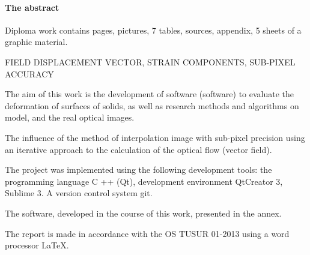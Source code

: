 \newpage
{}
\paragraph{\hfill The abstract \hfill}
Diploma work contains  pages,  pictures, 7 tables,  sources,  appendix, 5 sheets of a graphic material.

FIELD DISPLACEMENT VECTOR, STRAIN COMPONENTS, SUB-PIXEL ACCURACY

The aim of this work is the development of software (software) to evaluate the deformation of surfaces of solids, as well as research methods and algorithms on model, and the real optical images.

The influence of the method of interpolation image with sub-pixel precision using an iterative approach to the calculation of the optical flow (vector field).


The project was implemented using the following development tools: the programming language C ++ (Qt), development environment QtCreator 3, Sublime 3. A version control system git.

The software, developed in the course of this work, presented in the annex.

The report is made in accordance with the OS TUSUR 01-2013 using a word processor \LaTeX.